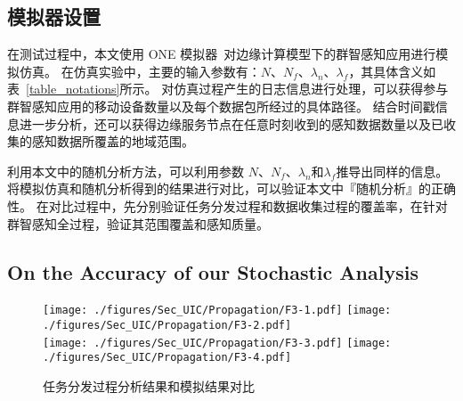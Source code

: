 \subsection{模拟器设置}
在测试过程中，本文使用 ONE 模拟器~\cite{DBLP:conf/simutools/OK09}对边缘计算模型下的群智感知应用进行模拟仿真。
在仿真实验中，主要的输入参数有：$N$、$N_f$、$\lambda_n$、$\lambda_f$，其具体含义如表~\ref{table_notations}所示。
对仿真过程产生的日志信息进行处理，可以获得参与群智感知应用的移动设备数量以及每个数据包所经过的具体路径。
结合时间戳信息进一步分析，还可以获得边缘服务节点在任意时刻收到的感知数据数量以及已收集的感知数据所覆盖的地域范围。

利用本文中的随机分析方法，可以利用参数 $N$、$N_f$、$\lambda_n$和$\lambda_f$推导出同样的信息。
将模拟仿真和随机分析得到的结果进行对比，可以验证本文中『随机分析』的正确性。
在对比过程中，先分别验证任务分发过程和数据收集过程的覆盖率，在针对群智感知全过程，验证其范围覆盖和感知质量。


\subsection{On the Accuracy of our Stochastic Analysis}

\begin{figure}[!b]
  \centering
  {\texttt{[image: ./figures/Sec\_UIC/Propagation/F3-1.pdf]}}
  {\texttt{[image: ./figures/Sec\_UIC/Propagation/F3-2.pdf]}}\\
  {\texttt{[image: ./figures/Sec\_UIC/Propagation/F3-3.pdf]}}
  {\texttt{[image: ./figures/Sec\_UIC/Propagation/F3-4.pdf]}}
  \vspace{-1em}
  \caption{任务分发过程分析结果和模拟结果对比}
  \label{Figure_PropagationTest}
\end{figure}

